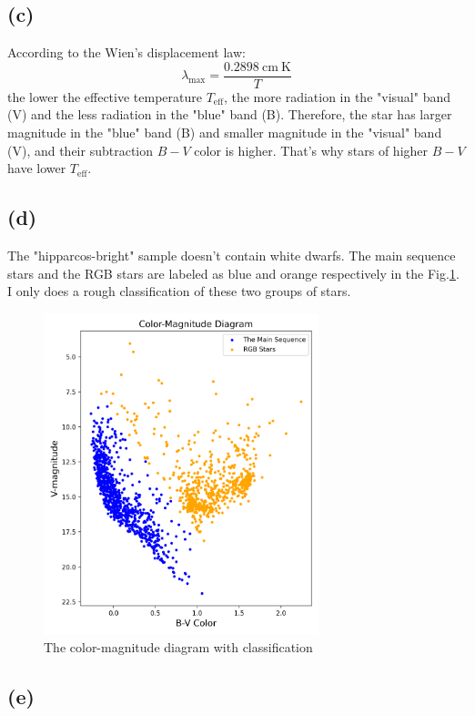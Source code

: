 \documentclass[a4paper,12pt]{article}
\begin{document}
\subsection*{(c)}
According to the Wien's displacement law:
\begin{equation}
    \lambda_{\text{max}} = \frac{0.2898 \ \text{cm} \ \text{K}}{T}
\end{equation}
the lower the effective temperature $T_{\text{eff}}$, the more radiation 
in the "visual" band (V) and the less radiation in the "blue" band (B). 
Therefore, the star has larger magnitude in the "blue" band (B) 
and smaller magnitude in the "visual" band (V), and their subtraction $B-V$ 
color is higher. That's why stars of higher $B-V$ have lower $T_{\text{eff}}$.

\subsection*{(d)}
The "hipparcos-bright" sample doesn't contain white dwarfs. The main sequence 
stars and the RGB stars are labeled as 
blue and orange respectively in the Fig.\ref{class}. 
I only does a rough classification of these two groups of stars.
\begin{figure}[htbp]
    \centering
    \includegraphics[width=8cm]{two_class.png}
    \caption{The color-magnitude diagram with classification}
    \label{class}
\end{figure}

\subsection*{(e)}
\end{document}
